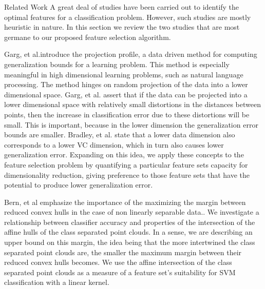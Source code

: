 \documentclass{llncs}
\begin{document}
\begin{section}{Related Work}
A great deal of studies have been carried out to identify the optimal features for a classification problem\cite{Molina}\cite{Joachims}. However, such studies are mostly heuristic in nature. In this section we review the two studies that are most germane to our proposed feature selection algorithm.

Garg, et al.introduce the projection profile, a data driven method for computing generalization bounds for a learning problem\cite{Garg}. This method is especially meaningful in high dimensional learning problems, such as natural language processing\cite{Garg}. The method hinges on random projection of the data into a lower dimensional space. Garg, et al. assert that if the data can be projected into a lower dimensional space with relatively small distortions in the distances between points, then the increase in classification error due to these distortions will be small\cite{Garg}. This is important, because in the lower dimension the generalization error bounds are smaller. Bradley, et al.\cite{Bradley} state that a lower data dimension also corresponds to a lower VC dimension, which in turn also causes lower generalization error\cite{Vapnik}. Expanding on this idea, we apply these concepts to the feature selection problem by quantifying a particular feature sets capacity for dimensionality reduction, giving preference to those feature sets that have the potential to produce lower generalization error.

Bern, et al emphasize the importance of the maximizing the margin between reduced convex hulls in the case of non linearly separable data.\cite{Bern}. We investigate a relationship between classifier accuracy and properties of the intersection of the affine hulls of the class separated point clouds. In a sense, we are describing an upper bound on this margin, the idea being that the more intertwined the class separated point clouds are, the smaller the maximum margin between their reduced convex hulls becomes. We use the affine intersection of the class separated point clouds as a measure of a feature set's suitability for SVM classification with a linear kernel.
\end{section}
\end{document}
